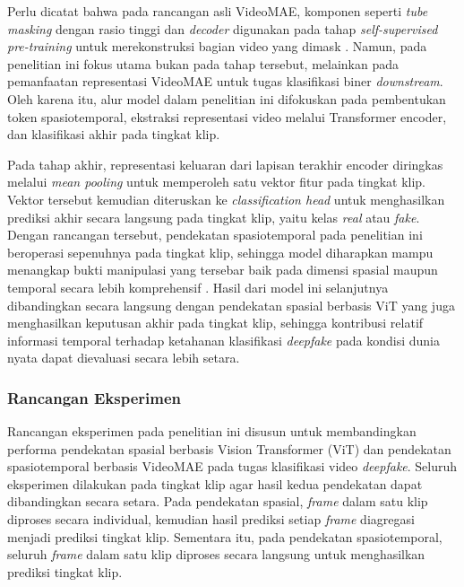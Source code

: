 Perlu dicatat bahwa pada rancangan asli VideoMAE, komponen seperti \textit{tube masking} dengan rasio tinggi dan \textit{decoder} digunakan pada tahap \textit{self-supervised pre-training} untuk merekonstruksi bagian video yang dimask \cite{tong2022videomaemaskedautoencodersdataefficient}. Namun, pada penelitian ini fokus utama bukan pada tahap tersebut, melainkan pada pemanfaatan representasi VideoMAE untuk tugas klasifikasi biner \textit{downstream}. Oleh karena itu, alur model dalam penelitian ini difokuskan pada pembentukan token spasiotemporal, ekstraksi representasi video melalui Transformer encoder, dan klasifikasi akhir pada tingkat klip. \par

Pada tahap akhir, representasi keluaran dari lapisan terakhir encoder diringkas melalui \textit{mean pooling} untuk memperoleh satu vektor fitur pada tingkat klip. Vektor tersebut kemudian diteruskan ke \textit{classification head} untuk menghasilkan prediksi akhir secara langsung pada tingkat klip, yaitu kelas \textit{real} atau \textit{fake}. Dengan rancangan tersebut, pendekatan spasiotemporal pada penelitian ini beroperasi sepenuhnya pada tingkat klip, sehingga model diharapkan mampu menangkap bukti manipulasi yang tersebar baik pada dimensi spasial maupun temporal secara lebih komprehensif \cite{Gu2021,tong2022videomaemaskedautoencodersdataefficient}. Hasil dari model ini selanjutnya dibandingkan secara langsung dengan pendekatan spasial berbasis ViT yang juga menghasilkan keputusan akhir pada tingkat klip, sehingga kontribusi relatif informasi temporal terhadap ketahanan klasifikasi \textit{deepfake} pada kondisi dunia nyata dapat dievaluasi secara lebih setara. \par

\subsubsection{Rancangan Eksperimen}
Rancangan eksperimen pada penelitian ini disusun untuk membandingkan performa pendekatan spasial berbasis Vision Transformer (ViT) dan pendekatan spasiotemporal berbasis VideoMAE pada tugas klasifikasi video \textit{deepfake}. Seluruh eksperimen dilakukan pada tingkat klip agar hasil kedua pendekatan dapat dibandingkan secara setara. Pada pendekatan spasial, \textit{frame} dalam satu klip diproses secara individual, kemudian hasil prediksi setiap \textit{frame} diagregasi menjadi prediksi tingkat klip. Sementara itu, pada pendekatan spasiotemporal, seluruh \textit{frame} dalam satu klip diproses secara langsung untuk menghasilkan prediksi tingkat klip. \par

